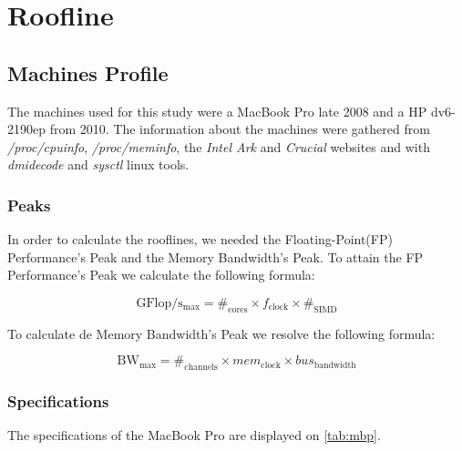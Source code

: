 \documentclass[a4paper,10pt,openright,openbib]{article}
\begin{document}
\section{Roofline}
\subsection{Machines Profile}
The machines used for this study were a MacBook Pro late 2008 and a HP dv6-2190ep from 2010.
The information about the machines were gathered from \emph{/proc/cpuinfo}, \emph{/proc/meminfo}, the \emph{Intel Ark} and \emph{Crucial} websites and with \emph{dmidecode} and \emph{sysctl} linux tools.

\subsubsection{Peaks}
In order to calculate the rooflines, we needed the Floating-Point(FP) Performance's Peak and the Memory Bandwidth's Peak. 
To attain the FP Performance's Peak we calculate the following formula:

$$\mathrm{GFlop/s_{max}} =  \#_{\mathrm{cores}} \times f_{\mathrm{clock}} \times \#_{\mathrm{SIMD}}$$


To calculate de Memory Bandwidth's Peak we resolve the following formula:

$$\mathrm{BW_{max}} =  \#_{\mathrm{channels}} \times mem_{\mathrm{clock}} \times bus_{\mathrm{bandwidth}}$$
 


\subsubsection{Specifications}
The specifications of the MacBook Pro are displayed on \autoref{tab:mbp}. \\
\end{document}
